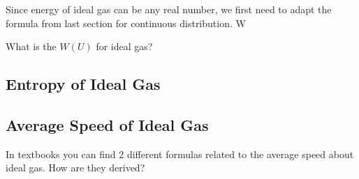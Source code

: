 \documentclass[class=article, crop=false, 12pt]{standalone}
\begin{document}
Since energy of ideal gas can be any real number,
we first need to adapt the formula from last section for continuous distribution.
W

What is the $W(U)$ for ideal gas?



\subsection{Entropy of Ideal Gas}


\subsection{Average Speed of Ideal Gas}

In textbooks you can find 2 different formulas 
related to the average speed about ideal gas. 
How are they derived?
\end{document}
